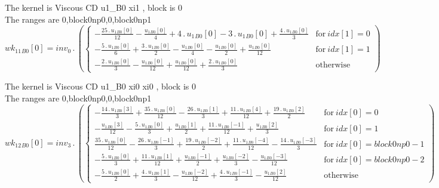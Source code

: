 \documentclass{article}
\begin{document}
\noindent The kernel is Viscous CD u1_B0 xi1 , block is 0\\\noindent The ranges are 0,block0np0,0,block0np1\\\begin{dmath}{wk_{11}{_{B0}}}[{0}] = inv_0 \,.\, \left(\begin{cases} - \frac{25 \,.\, {u_{1}{_{B0}}}[{0}]}{12} - \frac{{u_{1}{_{B0}}}[{0}]}{4} + 4 \,.\, {u_{1}{_{B0}}}[{0}] - 3 \,.\, {u_{1}{_{B0}}}[{0}] + \frac{4 \,.\, {u_{1}{_{B0}}}[{0}]}{3} & 
\text{for}\: {idx}[{1}] = 0 \\- \frac{5 \,.\, {u_{1}{_{B0}}}[{0}]}{6} + \frac{3 \,.\, {u_{1}{_{B0}}}[{0}]}{2} - \frac{{u_{1}{_{B0}}}[{0}]}{4} - \frac{{u_{1}{_{B0}}}[{0}]}{2} + \frac{{u_{1}{_{B0}}}[{0}]}{12} & \text{for}\: {idx}[{1}] = 1 \\- \frac{2 
\,.\, {u_{1}{_{B0}}}[{0}]}{3} - \frac{{u_{1}{_{B0}}}[{0}]}{12} + \frac{{u_{1}{_{B0}}}[{0}]}{12} + \frac{2 \,.\, {u_{1}{_{B0}}}[{0}]}{3} & \text{otherwise} \end{cases}\right)\end{dmath}

\noindent The kernel is Viscous CD u1_B0 xi0 xi0 , block is 0\\\noindent The ranges are 0,block0np0,0,block0np1\\\begin{dmath}{wk_{12}{_{B0}}}[{0}] = inv_3 \,.\, \left(\begin{cases} - \frac{14 \,.\, {u_{1}{_{B0}}}[{3}]}{3} + \frac{35 \,.\, {u_{1}{_{B0}}}[{0}]}{12} - \frac{26 \,.\, {u_{1}{_{B0}}}[{1}]}{3} + \frac{11 \,.\, {u_{1}{_{B0}}}[{4}]}{12} + \frac{19 
\,.\, {u_{1}{_{B0}}}[{2}]}{2} & \text{for}\: {idx}[{0}] = 0 \\- \frac{{u_{1}{_{B0}}}[{3}]}{12} - \frac{5 \,.\, {u_{1}{_{B0}}}[{0}]}{3} + \frac{{u_{1}{_{B0}}}[{1}]}{2} + \frac{11 \,.\, {u_{1}{_{B0}}}[{-1}]}{12} + \frac{{u_{1}{_{B0}}}[{2}]}{3} & 
\text{for}\: {idx}[{0}] = 1 \\\frac{35 \,.\, {u_{1}{_{B0}}}[{0}]}{12} - \frac{26 \,.\, {u_{1}{_{B0}}}[{-1}]}{3} + \frac{19 \,.\, {u_{1}{_{B0}}}[{-2}]}{2} + \frac{11 \,.\, {u_{1}{_{B0}}}[{-4}]}{12} - \frac{14 \,.\, {u_{1}{_{B0}}}[{-3}]}{3} & 
\text{for}\: {idx}[{0}] = block0np0 - 1 \\- \frac{5 \,.\, {u_{1}{_{B0}}}[{0}]}{3} + \frac{11 \,.\, {u_{1}{_{B0}}}[{1}]}{12} + \frac{{u_{1}{_{B0}}}[{-1}]}{2} + \frac{{u_{1}{_{B0}}}[{-2}]}{3} - \frac{{u_{1}{_{B0}}}[{-3}]}{12} & \text{for}\: {idx}[{0}] 
= block0np0 - 2 \\- \frac{5 \,.\, {u_{1}{_{B0}}}[{0}]}{2} + \frac{4 \,.\, {u_{1}{_{B0}}}[{1}]}{3} - \frac{{u_{1}{_{B0}}}[{-2}]}{12} + \frac{4 \,.\, {u_{1}{_{B0}}}[{-1}]}{3} - \frac{{u_{1}{_{B0}}}[{2}]}{12} & \text{otherwise} 
\end{cases}\right)\end{dmath}
\end{document}
